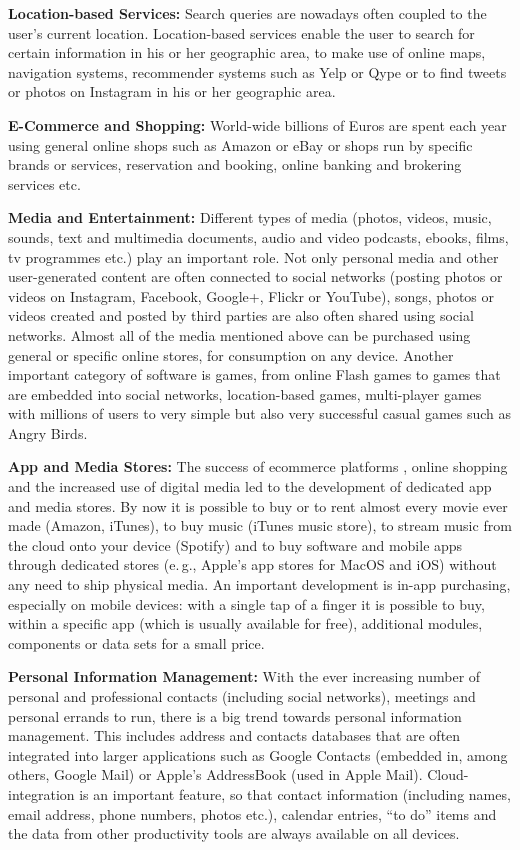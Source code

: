 \documentclass[10pt, plain]{../../metanetpaper}
\begin{document}
\begin{multicols}{2}
\textbf{Location-based Services:} Search queries are nowadays often coupled to the user's current location. Location-based services enable the user to search for certain information in his or her geographic area, to make use of online maps, navigation systems, recommender systems such as Yelp or Qype or to find tweets or photos on Instagram in his or her geographic area.

\textbf{E-Commerce and Shopping:} World-wide billions of Euros are spent each year using general online shops such as Amazon or eBay or shops run by specific brands or services, reservation and booking, online banking and brokering services etc. 

\textbf{Media and Entertainment:} Different types of media (photos, videos, music, sounds, text and multimedia documents, audio and video podcasts, ebooks, films, tv programmes etc.) play an important role. Not only personal media and other user-generated content are often connected to social networks (posting photos or videos on Instagram, Facebook, Google+, Flickr or YouTube), songs, photos or videos created and posted by third parties are also often shared using social networks. Almost all of the media mentioned above can be purchased using general or specific online stores, for consumption on any device. Another important category of software is games, from online Flash games to games that are embedded into social networks, location-based games, multi-player games with millions of users to very simple but also very successful casual games such as Angry Birds.

\textbf{App and Media Stores:} The success of ecommerce platforms \cite{bruegel12}, online shopping and the increased use of digital media led to the development of dedicated app and media stores. By now it is possible to buy or to rent almost every movie ever made (Amazon, iTunes), to buy music (iTunes music store), to stream music from the cloud onto your device (Spotify) and to buy software and mobile apps through dedicated stores (e.\,g., Apple's app stores for MacOS and iOS) without any need to ship physical media. An important development is in-app purchasing, especially on mobile devices: with a single tap of a finger it is possible to buy, within a specific app (which is usually available for free), additional modules, components or data sets for a small price.

\textbf{Personal Information Management:} With the ever increasing number of personal and professional contacts (including social networks), meetings and personal errands to run, there is a big trend towards personal information management. This includes address and contacts databases that are often integrated into larger applications such as Google Contacts (embedded in, among others, Google Mail) or Apple's AddressBook (used in Apple Mail). Cloud-integration is an important feature, so that contact information (including names, email address, phone numbers, photos etc.), calendar entries, ``to do'' items and the data from other productivity tools are always available on all devices. 


\end{multicols}
\end{document}
